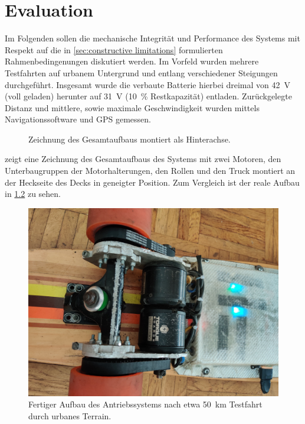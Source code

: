 \chapter{Evaluation}
	Im Folgenden sollen die mechanische Integrität und Performance des Systems mit Respekt auf die in \cref{sec:constructive limitations} formulierten Rahmenbedingenungen diskutiert werden.
	Im Vorfeld wurden mehrere Testfahrten auf urbanem Untergrund und entlang verschiedener Steigungen durchgeführt.
	Insgesamt wurde die verbaute Batterie hierbei dreimal von \qty{42}{\volt} (voll geladen) herunter auf \qty{31}{\volt} (\qty{10}{\percent} Restkapazität) entladen.
	Zurückgelegte Distanz und mittlere, sowie maximale Geschwindigkeit wurden mittels Navigationssoftware und GPS gemessen.
	\begin{figure}[h]
		\centering
		
		\caption[Zeichnung des Gesamtaufbaus]{Zeichnung des Gesamtaufbaus montiert als Hinterachse.}
		\label{fig:drivetrain inclined}
	\end{figure}
	 zeigt eine Zeichnung des Gesamtaufbaus des Systems mit zwei Motoren, den Unterbaugruppen der Motorhalterungen, den Rollen und den Truck montiert an der Heckseite des Decks in geneigter Position.
	Zum Vergleich ist der reale Aufbau in \cref{fig:real world assembly} zu sehen.
	\begin{figure}[h]
		\centering
		\includegraphics[angle=180, width=.5\textwidth]{Footage/Pictures/Drivetrain close up v2.jpg}
		\caption[Fertiger Aufbau des Antriebssystems]{Fertiger Aufbau des Antriebssystems nach etwa \qty{50}{\kilo\metre} Testfahrt durch urbanes Terrain.}
		\label{fig:real world assembly}
	\end{figure}

